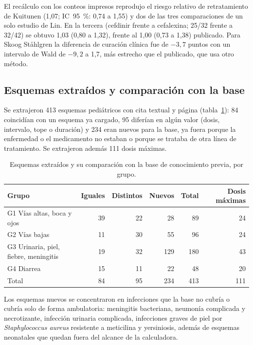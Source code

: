 \documentclass[11pt,a4paper]{article}
\begin{document}
El recálculo con los conteos impresos reprodujo el riesgo relativo de retratamiento de Kuitunen (1,07; IC~95~\%: 0,74 a 1,55) y dos de las tres comparaciones de un solo estudio de Lin. En la tercera (cefdinir frente a cefalexina; 25/32 frente a 32/42) se obtuvo 1,03 (0,80 a 1,32), frente al 1,00 (0,73 a 1,38) publicado. Para Skoog Ståhlgren la diferencia de curación clínica fue de $-3{,}7$ puntos con un intervalo de Wald de $-9{,}2$ a 1,7, más estrecho que el publicado, que usa otro método.

\subsection{Esquemas extraídos y comparación con la base}

Se extrajeron 413 esquemas pediátricos con cita textual y página (tabla~\ref{tab:extraccion}): 84 coincidían con un esquema ya cargado, 95 diferían en algún valor (dosis, intervalo, tope o duración) y 234 eran nuevos para la base, ya fuera porque la enfermedad o el medicamento no estaban o porque se trataba de otra línea de tratamiento. Se extrajeron además 111 dosis máximas.

\begin{table}[htbp]
\centering
\caption{Esquemas extraídos y su comparación con la base de conocimiento previa, por grupo.}
\label{tab:extraccion}
\small
\begin{tabular}{@{}lrrrrr@{}}
\toprule
Grupo & Iguales & Distintos & Nuevos & Total & Dosis máximas \\
\midrule
G1 Vías altas, boca y ojos & 39 & 22 & 28 & 89 & 24 \\
G2 Vías bajas & 11 & 30 & 55 & 96 & 24 \\
G3 Urinaria, piel, fiebre, meningitis & 19 & 32 & 129 & 180 & 43 \\
G4 Diarrea & 15 & 11 & 22 & 48 & 20 \\
\midrule
Total & 84 & 95 & 234 & 413 & 111 \\
\bottomrule
\end{tabular}
\end{table}

Los esquemas nuevos se concentraron en infecciones que la base no cubría o cubría solo de forma ambulatoria: meningitis bacteriana, neumonía complicada y necrotizante, infección urinaria complicada, infecciones graves de piel por \emph{Staphylococcus aureus} resistente a meticilina y yersiniosis, además de esquemas neonatales que quedan fuera del alcance de la calculadora.
\end{document}
